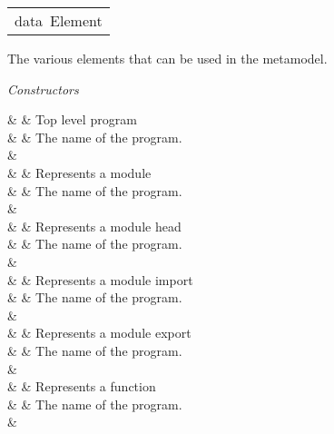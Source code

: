 \begin{haddockdesc}
\item[\begin{tabular}{@{}l}
data\ Element
\end{tabular}]\haddockbegindoc
The various elements that can be used in the metamodel.\par

\enspace \emph{Constructors}\par
\haddockbeginconstrs
\haddockdecltt{=} &  & Top level program \\
                                              & \haddocktt{\qquad \{}  & The name of the program. \\ & \haddocktt{\qquad \}} \\
\haddockdecltt{|} &  & Represents a module \\
                                             & \haddocktt{\qquad \{}  & The name of the program. \\ & \haddocktt{\qquad \}} \\
\haddockdecltt{|} &  & Represents a module head \\
                                                 & \haddocktt{\qquad \{}  & The name of the program. \\ & \haddocktt{\qquad \}} \\
\haddockdecltt{|} &  & Represents a module import \\
                                                   & \haddocktt{\qquad \{}  & The name of the program. \\ & \haddocktt{\qquad \}} \\
\haddockdecltt{|} &  & Represents a module export \\
                                                   & \haddocktt{\qquad \{}  & The name of the program. \\ & \haddocktt{\qquad \}} \\
\haddockdecltt{|} &  & Represents a function \\
                                               & \haddocktt{\qquad \{}  & The name of the program. \\ & \haddocktt{\qquad \}} \\

\end{haddockdesc}
